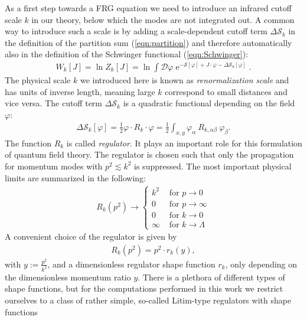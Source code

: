 As a first step towards a FRG equation we need to introduce an infrared cutoff scale $k$ in our theory, below which the modes are not integrated out. A common way to introduce such a scale is by  adding a scale-dependent cutoff term $\Delta\mathcal{S}_k$ in the definition of the partition sum (\ref{eqn:partition}) and therefore automatically also in the definition of the Schwinger functional (\ref{eqn:Schwinger}):
\begin{align}
W_{k}[J]=\ln Z_{k}[J]=\ln \int \mathcal{D} \varphi  \operatorname{e}^{-\mathcal{S}[\varphi]+J \cdot \varphi-\Delta \mathcal{S}_{k}[\varphi]}.
\label{eqn:Wk}
\end{align}
The physical scale $k$ we introduced here is known as \textit{renormalization scale} and has units of inverse length, meaning large $k$ correspond to small distances and vice versa. The cutoff term $\Delta\mathcal{S}_k$ is a quadratic functional depending on the field $\varphi$:
\begin{align}
	\Delta \mathcal{S}_{k}[\varphi]=\frac{1}{2} \varphi \cdot R_{k} \cdot \varphi=\frac{1}{2} \int_{x, y} \varphi_{\alpha} \ R_{k, \alpha\beta} \ \varphi_{\beta}.
\end{align}
The function $R_k$ is called \textit{regulator}. It plays an important role for this formulation of quantum field theory. The regulator is chosen such that only the propagation for momentum modes with $p^2 \lesssim k^2$ is suppressed. The most important physical limits are summarized in the following:
\begin{align}
	R_{k}(p^2) \rightarrow\left\{\begin{array}{ll}{k^{2}} & {\text { for } p \rightarrow 0} \\ {0} & {\text { for } p \rightarrow \infty} \\ {0} & {\text { for } k \rightarrow 0} \\ {\infty} & {\text { for } k \rightarrow \Lambda}\end{array}\right.
\label{eqn:regulator_limits}
\end{align}
A convenient choice of the regulator is given by
\begin{align}
	R_k(p^2) = p^2 \cdot r_k(y),
\end{align}
with $ y := \frac{p^2}{k^2}$, and a dimensionless regulator shape function $r_k$, only depending on the dimensionless momentum ratio $y$. There is a plethora of different types of shape functions, but for the computations performed in this work we restrict ourselves to a class of rather simple, so-called Litim-type regulators with shape functions
